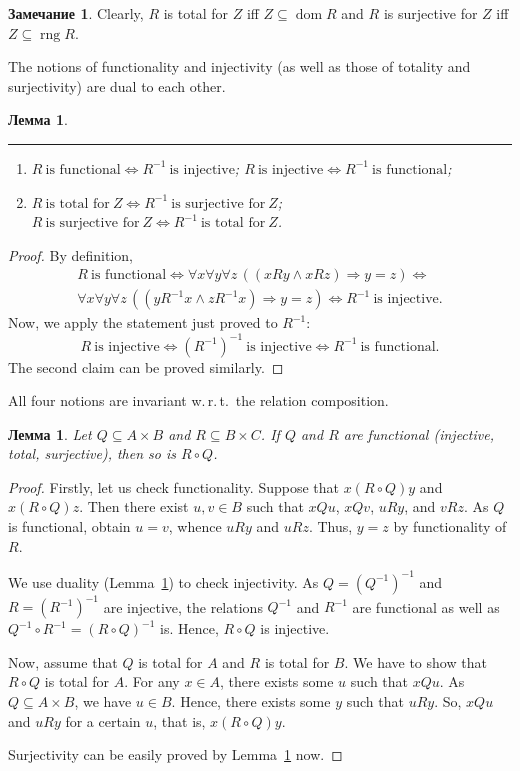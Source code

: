 \documentclass[12pt,notitlepage]{article}
\theoremstyle{plain}
\newtheorem{lemma}[thm]{Лемма}
\theoremstyle{definition}
\newtheorem{rem}[thm]{Замечание}
\theoremstyle{plain}
\newcommand{\sbs}{\subseteq}
\newcommand{\dom}{\mathop{\mathrm{dom}}}
\newcommand{\rng}{\mathop{\mathrm{rng}}}
\newcommand{\1}{\mathbf{1}}
\newcommand{\0}{\mathbf{0}}
\newcommand{\ply}{\Longrightarrow}
\begin{document}
\begin{rem}
	Clearly, $R$ is total for $Z$ iff $Z \sbs \dom R$ and $R$ is surjective for $Z$ iff $Z \sbs \rng R$.
\end{rem}


The notions of functionality and injectivity (as well as those of totality and surjectivity) are dual to each other.
\begin{lemma}\label{ch0:fnc_inv}\rule{1pt}{0pt}
	\begin{enumerate}
		\item $R\ \mbox{is functional} \iff R^{-1}\ \mbox{is injective}$; $R\ \mbox{is injective} \iff R^{-1}\ \mbox{is functional}$;
		\item $R\ \mbox{is total for}\ Z \iff R^{-1}\ \mbox{is surjective for}\ Z$; $R\ \mbox{is surjective for}\ Z \iff R^{-1}\ \mbox{is total for}\ Z$.
	\end{enumerate}
\end{lemma}
\begin{proof}
	By definition,
	\begin{multline*}
		R\ \mbox{is functional} \iff \forall x \forall y \forall z\, ( (x R y \wedge x R z) \ply y = z ) \iff\\
		\forall x \forall y \forall z\, ( (y R^{-1} x \wedge z R^{-1} x) \ply y = z )  \iff R^{-1}\ \mbox{is injective}.
	\end{multline*}
	Now, we apply the statement just proved to $R^{-1}$:
	$$
	R\ \mbox{is injective} \iff (R^{-1})^{-1}\ \mbox{is injective} \iff R^{-1}\ \mbox{is functional}.
	$$
	The second claim can be proved similarly.
\end{proof}


\noindent All four notions are invariant w.\,r.\,t.\ the relation composition.
\begin{lemma}\label{ch0:fnc_cmp} Let $Q \sbs A \times B$ and $R \sbs B \times C$.  If $Q$ and $R$ are functional (injective, total, surjective), then so is $R \circ Q$.
\end{lemma}
\begin{proof}
	Firstly, let us check functionality. Suppose that $x(R \circ Q)y$ and $x(R \circ Q)z$. Then there exist $u,v\in B$ such that $xQu$, $xQv$, $u R y$, and $v R z$. As $Q$ is functional, obtain $u = v$, whence $u R y$ and $u R z$. Thus, $y = z$ by functionality of $R$.
	
	We use duality (Lemma~\ref{ch0:fnc_inv}) to check injectivity. As $Q = (Q^{-1})^{-1}$ and $R = (R^{-1})^{-1}$ are injective, the relations $Q^{-1}$ and $R^{-1}$ are functional as well as $Q^{-1} \circ R^{-1} = (R \circ Q)^{-1}$ is. Hence, $R \circ Q$ is injective.
	
	Now, assume that $Q$ is total for $A$ and $R$ is total for $B$. We have to show that $R \circ Q$ is total for $A$. For any $x \in A$, there exists some $u$ such that $x Q u$. As $Q \sbs A \times B$, we have $u \in B$. Hence, there exists some $y$ such that $u R y$. So, $x Q u$ and $u R y$ for a certain $u$, that is, $x(R \circ Q)y$.
	
	Surjectivity can be easily proved by Lemma~\ref{ch0:fnc_inv} now.
\end{proof}
\end{document}
